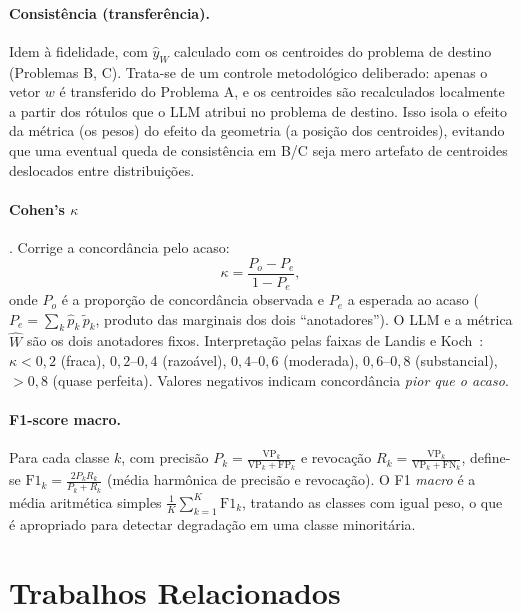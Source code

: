 \documentclass[12pt,a4paper]{article}
\newcommand{\West}{\ensuremath{\hat{W}}}   %
\begin{document}
\paragraph{Consistência (transferência).}
Idem à fidelidade, com $\hat{y}_{\West}$ calculado com os centroides do problema de destino
(Problemas B, C). Trata-se de um controle metodológico deliberado: apenas o vetor $w$ é
transferido do Problema A, e os centroides são recalculados localmente a partir dos rótulos
que o LLM atribui no problema de destino. Isso isola o efeito da métrica (os pesos) do
efeito da geometria (a posição dos centroides), evitando que uma eventual queda de
consistência em B/C seja mero artefato de centroides deslocados entre distribuições.

\paragraph{Cohen's $\kappa$} \cite{artsteinInterCoder2008}. Corrige a concordância pelo
acaso:
\begin{equation}
  \kappa = \frac{P_o - P_e}{1 - P_e},
\end{equation}
onde $P_o$ é a proporção de concordância observada e $P_e$ a esperada ao acaso
($P_e = \sum_k \hat{p}_k\,\tilde{p}_k$, produto das marginais dos dois ``anotadores''). O
LLM e a métrica \West{} são os dois anotadores fixos. Interpretação pelas faixas de Landis e
Koch~\cite{landisKoch1977}: $\kappa<0{,}2$ (fraca),
$0{,}2$–$0{,}4$ (razoável), $0{,}4$–$0{,}6$ (moderada), $0{,}6$–$0{,}8$ (substancial),
$>0{,}8$ (quase perfeita). Valores negativos indicam concordância \emph{pior que o acaso}.

\paragraph{F1-score macro.} Para cada classe $k$, com precisão
$P_k = \frac{\text{VP}_k}{\text{VP}_k + \text{FP}_k}$ e revocação
$R_k = \frac{\text{VP}_k}{\text{VP}_k + \text{FN}_k}$, define-se
$\text{F1}_k = \frac{2 P_k R_k}{P_k + R_k}$ (média harmônica de precisão e revocação). O
F1 \emph{macro} é a média aritmética simples $\frac{1}{K}\sum_{k=1}^K \text{F1}_k$, tratando
as classes com igual peso, o que é apropriado para detectar degradação em uma classe
minoritária.

\section{Trabalhos Relacionados}
\label{sec:relacionados}
\end{document}
